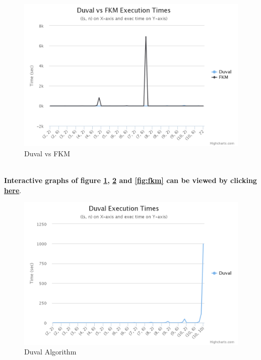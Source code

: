 \documentclass[12pt,twoside]{article}
\begin{document}
\begin{figure}
  \centering
    \includegraphics[width=6in]{exectimes.png}
  \caption{Duval vs FKM}
  \label{fig:exectimes}
\end{figure}
\\
\textbf{Interactive graphs of figure \ref{fig:exectimes}, \ref{fig:duval} and \ref{fig:fkm} can be viewed by clicking \href{http://homepages.uc.edu/~dungavjk/webres/work/exectimes.html}{here}}. \\

\begin{figure}
  \centering
    \includegraphics[width=6in]{duval.png}
  \caption{Duval Algorithm}
  \label{fig:duval}
\end{figure}
\end{document}
